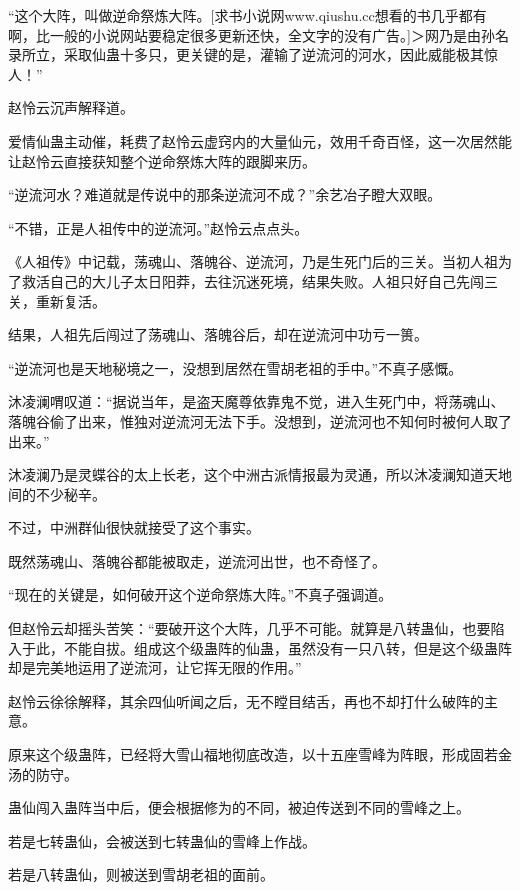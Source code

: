 
\begin{this_body}

“这个大阵，叫做逆命祭炼大阵。[求书小说网www.qiushu.cc想看的书几乎都有啊，比一般的小说网站要稳定很多更新还快，全文字的没有广告。]＞网乃是由孙名录所立，采取仙蛊十多只，更关键的是，灌输了逆流河的河水，因此威能极其惊人！”

赵怜云沉声解释道。

爱情仙蛊主动催，耗费了赵怜云虚窍内的大量仙元，效用千奇百怪，这一次居然能让赵怜云直接获知整个逆命祭炼大阵的跟脚来历。

“逆流河水？难道就是传说中的那条逆流河不成？”余艺冶子瞪大双眼。

“不错，正是人祖传中的逆流河。”赵怜云点点头。

《人祖传》中记载，荡魂山、落魄谷、逆流河，乃是生死门后的三关。当初人祖为了救活自己的大儿子太日阳莽，去往沉迷死境，结果失败。人祖只好自己先闯三关，重新复活。

结果，人祖先后闯过了荡魂山、落魄谷后，却在逆流河中功亏一篑。

“逆流河也是天地秘境之一，没想到居然在雪胡老祖的手中。”不真子感慨。

沐凌澜喟叹道：“据说当年，是盗天魔尊依靠鬼不觉，进入生死门中，将荡魂山、落魄谷偷了出来，惟独对逆流河无法下手。没想到，逆流河也不知何时被何人取了出来。”

沐凌澜乃是灵蝶谷的太上长老，这个中洲古派情报最为灵通，所以沐凌澜知道天地间的不少秘辛。

不过，中洲群仙很快就接受了这个事实。

既然荡魂山、落魄谷都能被取走，逆流河出世，也不奇怪了。

“现在的关键是，如何破开这个逆命祭炼大阵。”不真子强调道。

但赵怜云却摇头苦笑：“要破开这个大阵，几乎不可能。就算是八转蛊仙，也要陷入于此，不能自拔。组成这个级蛊阵的仙蛊，虽然没有一只八转，但是这个级蛊阵却是完美地运用了逆流河，让它挥无限的作用。”

赵怜云徐徐解释，其余四仙听闻之后，无不瞠目结舌，再也不却打什么破阵的主意。

原来这个级蛊阵，已经将大雪山福地彻底改造，以十五座雪峰为阵眼，形成固若金汤的防守。

蛊仙闯入蛊阵当中后，便会根据修为的不同，被迫传送到不同的雪峰之上。

若是七转蛊仙，会被送到七转蛊仙的雪峰上作战。

若是八转蛊仙，则被送到雪胡老祖的面前。


\end{this_body}
